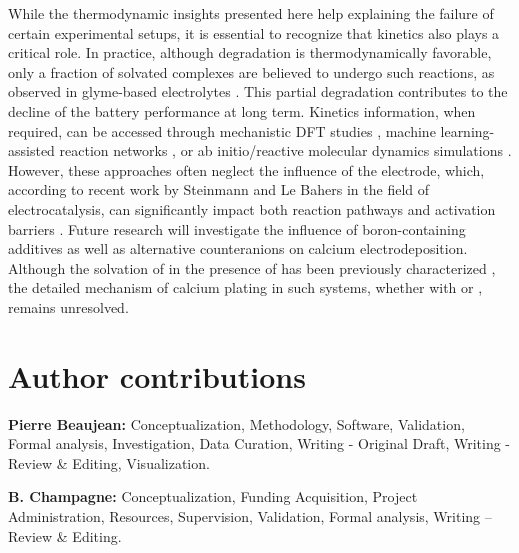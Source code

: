 \documentclass[twoside,twocolumn,9pt]{article}
\begin{document}
{While the thermodynamic insights presented here help explaining the failure of certain experimental setups,\cite{nguyenSolvationReductionCoupling2023} it is essential to recognize that kinetics also plays a critical role. 
In practice, although degradation is thermodynamically favorable, only a fraction of solvated  complexes are believed to undergo such reactions, as observed in glyme-based electrolytes \cite{baonguyenInvestigatingAbnormalConductivity2022}. 
This partial degradation contributes to the decline of the battery performance at long term. 
Kinetics information, when required, can be accessed through mechanistic DFT studies \cite{bodinBoronBasedFunctionalAdditives2023}, machine learning-assisted reaction networks \cite{xieDataDrivenPredictionFormation2021}, or ab initio/reactive molecular dynamics simulations \cite{manzanoHydrationCalciumOxide2012,youngEthyleneCarbonateBasedElectrolyte2018,youngPreventingElectrolyteDecomposition2021,yamijalaStabilityCalciumIon2021,gaoComparativeStudyReductive2024}. 
However, these approaches often neglect the influence of the electrode, which, according to recent work by Steinmann and Le Bahers in the field of electrocatalysis, can significantly impact both reaction pathways and activation barriers \cite{curutchetTwositesAreBetter2020,ramzanElectrocatalyticReductionMechanisms2024}.
Future research will investigate the influence of boron-containing additives as well as alternative counteranions on calcium electrodeposition. Although the solvation of  in the presence of  has been previously characterized \cite{melemedCurrentUnderstandingNonaqueous2020,araujoNovelCalciumBattery2021,sanzmatiasCadimersSolventLayering2024}, the detailed mechanism of calcium plating in such systems, whether with  \cite{forero-saboyaBoronbasedElectrolyteAdditive2021,melemedImpactDifferentialCa22023} or  \cite{bodinBoronBasedFunctionalAdditives2023}, remains unresolved.

\section*{Author contributions}

\textbf{Pierre Beaujean:} Conceptualization, Methodology, Software, Validation, Formal analysis, Investigation, Data Curation, Writing - Original Draft, Writing - Review \& Editing, Visualization.

\textbf{B. Champagne:} Conceptualization, Funding Acquisition, Project Administration, Resources, Supervision, Validation, Formal analysis, Writing -- Review \& Editing.
	
}
\end{document}
